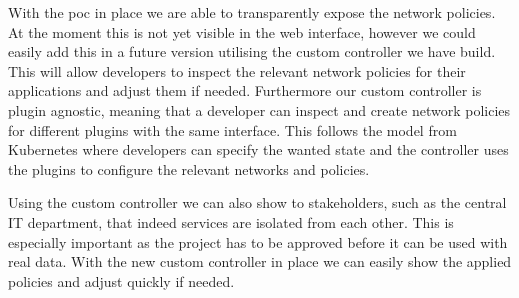With the \gls{poc} in place we are able to transparently expose the network policies. At the moment this is not yet visible in the web interface, however we could easily add this in a future version utilising the custom controller we have build. This will allow developers to inspect the relevant network policies for their applications and adjust them if needed. Furthermore our custom controller is plugin agnostic, meaning that a developer can inspect and create network policies for different plugins with the same interface. This follows the model from Kubernetes where developers can specify the wanted state and the controller uses the plugins to configure the relevant networks and policies. 

Using the custom controller we can also show to stakeholders, such as the central IT department, that indeed services are isolated from each other. This is especially important as the project has to be approved before it can be used with real data. With the new custom controller in place we can easily show the applied policies and adjust quickly if needed.
